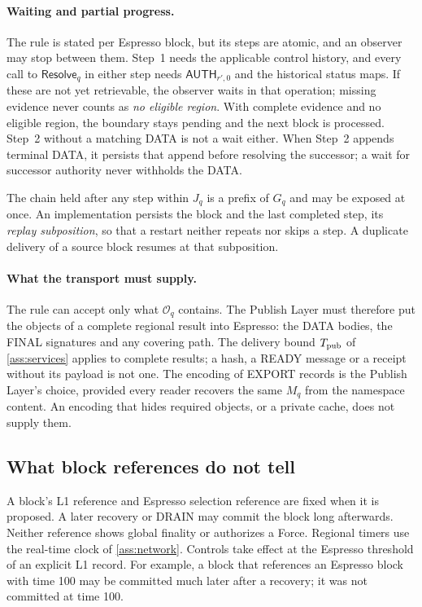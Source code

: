 \documentclass[11pt,a4paper]{article}
\newcommand{\tagg}[1]{\ensuremath{\mathsf{#1}}}
\newcommand{\defterm}[1]{\textcolor{rrBlue}{\textit{#1}}}
\begin{document}
\paragraph{Waiting and partial progress.}
\label{sec:subpositions}
\label{sec:terminal-commit}
The rule is stated per Espresso block, but its steps are atomic, and an
observer may stop between them. Step~1 needs the applicable control
history, and every call to $\tagg{Resolve}_q$ in either step needs
$\tagg{AUTH}_{r',0}$ and the historical status maps. If these are not yet
retrievable, the observer waits in that operation; missing evidence never
counts as \emph{no eligible region}. With complete evidence and no
eligible region, the boundary stays pending and the next block is
processed. Step~2 without a matching DATA is not a wait either. When
Step~2 appends terminal DATA, it persists that append before resolving
the successor; a wait for successor authority never withholds the DATA.

The chain held after any step within $J_q$ is a prefix of $G_q$ and may
be exposed at once. An implementation persists the block and the last
completed step, its \defterm{replay subposition}, so that a restart
neither repeats nor skips a step. A duplicate delivery of a source block
resumes at that subposition.

\paragraph{What the transport must supply.}
\label{sec:transport-scope}
The rule can accept only what $\mathcal O_q$ contains. The Publish Layer
must therefore put the objects of a complete regional result into
Espresso: the DATA bodies, the FINAL signatures and any covering path.
The delivery bound $T_{\rm pub}$ of \cref{ass:services} applies to
complete results; a hash, a READY message or a receipt without its
payload is not one. The encoding of EXPORT records is the Publish Layer's
choice, provided every reader recovers the same $M_q$ from the namespace
content. An encoding that hides required objects, or a private cache,
does not supply them.

\subsection{What block references do not tell}
\label{sec:late-receipt}
A block's L1 reference and Espresso selection reference are fixed when it
is proposed. A later recovery or DRAIN may commit the block long
afterwards. Neither reference shows global finality or authorizes a
Force. Regional timers use the real-time clock of \cref{ass:network}.
Controls take effect at the Espresso threshold of an explicit L1 record.
For example, a block that references an Espresso block with time 100 may
be committed much later after a recovery; it was not committed at time
100.
\end{document}
